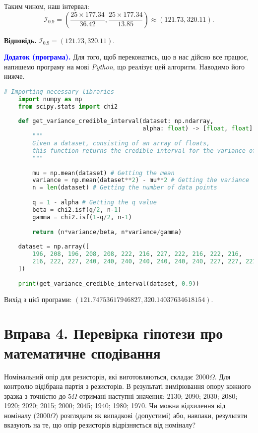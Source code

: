 \documentclass{../hw_template}
\begin{document}
Таким чином, наш інтервал:
\begin{equation*}
    \mathcal{I}_{0.9} = \left(\frac{25 \times 177.34}{36.42}, \frac{25 \times 177.34}{13.85}\right) \approx (121.73, 320.11).
\end{equation*}

\textbf{Відповідь.} $\mathcal{I}_{0.9} = (121.73, 320.11)$.

\textcolor{blue}{\textbf{Додаток (програма).}} Для того, щоб переконатись, що в нас дійсно все працює, напишемо програму на мові \textit{Python}, що реалізує цей алгоритм. Наводимо його нижче.

\begin{lstlisting}[language=Python]
    # Importing necessary libraries
    import numpy as np 
    from scipy.stats import chi2
    
    def get_variance_credible_interval(dataset: np.ndarray,
                                       alpha: float) -> [float, float]:
        """
        Given a dataset, consisting of an array of floats, 
        this function returns the credible interval for the variance of the dataset.
        """
        
        mu = np.mean(dataset) # Getting the mean
        variance = np.mean(dataset**2) - mu**2 # Getting the variance
        n = len(dataset) # Getting the number of data points
        
        q = 1 - alpha # Getting the q value
        beta = chi2.isf(q/2, n-1)
        gamma = chi2.isf(1-q/2, n-1)
        
        return (n*variance/beta, n*variance/gamma)
        
    dataset = np.array([
        196, 208, 196, 208, 208, 222, 216, 227, 222, 216, 222, 216,
        216, 222, 227, 240, 240, 240, 240, 240, 240, 240, 227, 227, 227
    ])
    
    print(get_variance_credible_interval(dataset, 0.9))
\end{lstlisting}

Вихід з цієї програми: $(121.74753617946827, 320.14037634618154)$.


\pagebreak

\section{Вправа 4. Перевірка гіпотези про математичне сподівання}

\begin{problems}
    Номінальний опір для резисторів, які виготовляються, складає 2000$\Omega$.
Для контролю відібрана партія з резисторів. В результаті вимірювання опору
кожного зразка з точністю до 5$\Omega$ отримані наступні значення: 2130; 2090;
2030; 2080; 1920; 2020; 2015; 2000; 2045; 1940; 1980; 1970. Чи можна
відхилення від номіналу (2000$\Omega$) розглядати як випадкові (допустимі) або,
навпаки, результати вказують на те, що опір резисторів відрізняється від номіналу?
\end{problems}
\end{document}
